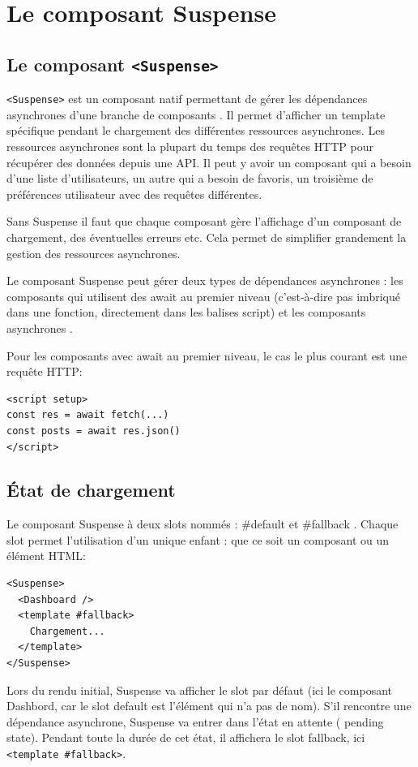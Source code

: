 \section{Le composant Suspense}
\subsection{Le composant {\tt <Suspense>}}
{\tt <Suspense>} est un composant natif permettant de gérer les dépendances asynchrones d'une branche de composants . Il permet d'afficher un {\color{monOrange}template} spécifique pendant le chargement des différentes ressources asynchrones. Les ressources asynchrones sont la plupart du temps des requêtes {\color{monOrange}HTTP} pour récupérer des données depuis une {\color{monOrange}API}. Il peut y avoir un composant qui a besoin d'une liste d'utilisateurs, un autre qui a besoin de favoris, un troisième de préférences utilisateur avec des requêtes différentes.

Sans {\color{monOrange}Suspense} il faut que chaque composant gère l'affichage d'un composant de chargement, des éventuelles erreurs etc. Cela permet de simplifier grandement la gestion des ressources asynchrones.

Le composant {\color{monOrange}Suspense} peut gérer deux types de dépendances asynchrones : les composants qui utilisent des {\color{monOrange}await} au premier niveau (c'est-à-dire pas imbriqué dans une fonction, directement dans les balises {\color{monOrange}script}) et les composants asynchrones .

Pour les composants avec {\color{monOrange}await} au premier niveau, le cas le plus courant est une requête {\color{monOrange}HTTP}:
\begin{verbatim}
<script setup>
const res = await fetch(...)
const posts = await res.json()
</script>
\end{verbatim}
\subsection{État de chargement}
Le composant {\color{monOrange}Suspense} à deux {\color{monOrange}slots} nommés : {\color{monOrange}\#default} et {\color{monOrange}\#fallback} . Chaque {\color{monOrange}slot} permet l'utilisation d'un unique enfant : que ce soit un composant ou un élément {\color{monOrange}HTML}:
\begin{verbatim}
<Suspense>
  <Dashboard />
  <template #fallback>
    Chargement...
  </template>
</Suspense>
\end{verbatim}
Lors du rendu initial, {\color{monOrange}Suspense} va afficher le {\color{monOrange}slot} par défaut (ici le composant {\color{monOrange}Dashbord}, car le {\color{monOrange}slot default} est l'élément qui n'a pas de nom). S'il rencontre une dépendance asynchrone, {\color{monOrange}Suspense} va entrer dans l'état en attente ( {\color{monOrange}pending state}). Pendant toute la durée de cet état, il affichera le {\color{monOrange}slot fallback}, ici {\tt <template \#fallback>}.

